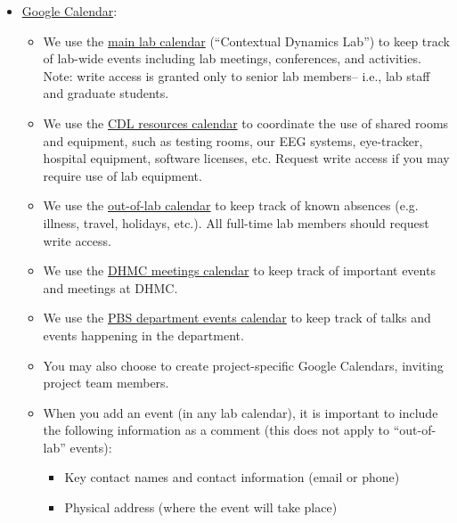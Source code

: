 \documentclass{tufte-book} %
\begin{document}
\begin{itemize}
\item \href{http://calendar.google.com}{Google Calendar}:
  \begin{itemize}
  \item We use the
    \href{https://calendar.google.com/calendar/embed?src=5ta50cfv4uih0a0k8m2di9dhjo%40group.calendar.google.com&ctz=America%2FNew_York}{main
      lab calendar} (``Contextual Dynamics Lab'') to keep track of lab-wide events including lab
    meetings, conferences, and activities.  Note: write access is
    granted only to senior lab members-- i.e., lab staff and graduate students.
  \item We use the
    \href{https://calendar.google.com/calendar/embed?src=dgcv8l8a8s10hfg2s5h0qec0q0%40group.calendar.google.com&ctz=America%2FNew_York}{CDL
      resources calendar} to coordinate the use of shared rooms and
    equipment, such as testing rooms, our EEG systems, eye-tracker,
    hospital equipment, software licenses, etc.  Request write access
    if you may require use of lab equipment.
  \item We use the
    \href{https://calendar.google.com/calendar/embed?src=h1j06dohcg7v1g2o5tkb7ijhvs%40group.calendar.google.com&ctz=America%2FNew_York}{out-of-lab
      calendar} to keep track of known absences (e.g. illness, travel,
    holidays, etc.).  All
    full-time lab members should request write access.
  \item We use the \href{https://calendar.google.com/calendar/embed?src=j6noo2tqahpsoq9na1h16paf3s%40group.calendar.google.com&ctz=America%2FNew_York}{DHMC meetings
  calendar} to keep track of important events and meetings at DHMC.
  \item We use the \href{https://calendar.google.com/calendar/embed?src=c_31ckainhaqlmhk4hkc633fs9ho%40group.calendar.google.com&ctz=America%2FNew_York}{PBS department events calendar} to keep track of talks and events happening in the department.
  \item You may also choose to create project-specific Google
    Calendars, inviting project team members.
  \item When you add an event (in any lab calendar), it is important
    to include the following information as a comment (this does not
    apply to ``out-of-lab'' events):
\begin{itemize}
\item Key contact names and contact information (email or phone)
\item Physical address (where the event will take place)

\end{itemize}
\end{itemize}
\end{itemize}
\end{document}
